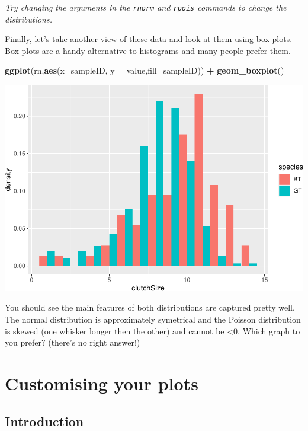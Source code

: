 \documentclass[
  a4paperpaper,
]{book}
\newenvironment{Shaded}{\begin{snugshade}}{\end{snugshade}}
\newcommand{\DataTypeTok}[1]{\textcolor[rgb]{0.13,0.29,0.53}{#1}}
\newcommand{\KeywordTok}[1]{\textcolor[rgb]{0.13,0.29,0.53}{\textbf{#1}}}
\newcommand{\NormalTok}[1]{#1}
\newcommand{\OperatorTok}[1]{\textcolor[rgb]{0.81,0.36,0.00}{\textbf{#1}}}
\newcommand{\StringTok}[1]{\textcolor[rgb]{0.31,0.60,0.02}{#1}}
\begin{document}
\emph{Try changing the arguments in the \texttt{rnorm} and \texttt{rpois} commands to change the distributions.}

Finally, let's take another view of these data and look at them using box plots. Box plots are a handy alternative to histograms and many people prefer them.

\begin{Shaded}
\begin{Highlighting}[]
\KeywordTok{ggplot}\NormalTok{(rn,}\KeywordTok{aes}\NormalTok{(}\DataTypeTok{x=}\NormalTok{sampleID, }\DataTypeTok{y =}\NormalTok{ value,}\DataTypeTok{fill=}\NormalTok{sampleID)) }\OperatorTok{+}
\StringTok{  }\KeywordTok{geom\_boxplot}\NormalTok{()}
\end{Highlighting}
\end{Shaded}

\begin{center}\includegraphics{BB852_files/figure-latex/unnamed-chunk-106-1} \end{center}

You should see the main features of both distributions are captured pretty well. The normal distribution is approximately symetrical and the Poisson distribution is skewed (one whisker longer then the other) and cannot be \textless0. Which graph to you prefer? (there's no right answer!)

\hypertarget{customising-your-plots}{%
\chapter{Customising your plots}\label{customising-your-plots}}

\hypertarget{introduction}{%
\section{Introduction}\label{introduction}}
\end{document}
